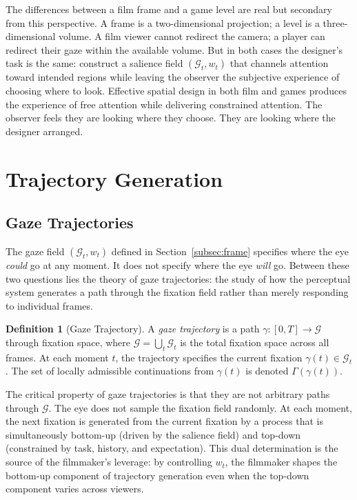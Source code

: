 \documentclass[12pt, a4paper]{article}
\theoremstyle{plain}
\theoremstyle{definition}
\newtheorem{definition}[theorem]{Definition}
\theoremstyle{remark}
\newcommand{\G}{\mathcal{G}}
\newcommand{\Traj}{\Gamma}
\newcommand{\traj}{\gamma}
\newcommand{\salience}{w}
\begin{document}
The differences between a film frame and a game level are
real but secondary from this perspective. A frame is a
two-dimensional projection; a level is a three-dimensional
volume. A film viewer cannot redirect the camera; a player
can redirect their gaze within the available volume. But in
both cases the designer's task is the same: construct a
salience field $(\G_t, \salience_t)$ that channels attention
toward intended regions while leaving the observer the
subjective experience of choosing where to look. Effective
spatial design in both film and games produces the experience
of free attention while delivering constrained attention.
The observer feels they are looking where they choose.
They are looking where the designer arranged.

\section{Trajectory Generation}
\label{sec:trajectory}

\subsection{Gaze Trajectories}
\label{subsec:gazetraj}

The gaze field $(\G_t, \salience_t)$ defined in
Section~\ref{subsec:frame} specifies where the eye
\emph{could} go at any moment. It does not specify where
the eye \emph{will} go. Between these two questions lies
the theory of gaze trajectories: the study of how the
perceptual system generates a path through the fixation
field rather than merely responding to individual frames.

\begin{definition}[Gaze Trajectory]
  A \emph{gaze trajectory} is a path $\traj : [0,T] \to \G$
  through fixation space, where $\G = \bigcup_t \G_t$ is
  the total fixation space across all frames. At each
  moment $t$, the trajectory specifies the current fixation
  $\traj(t) \in \G_t$. The set of locally admissible
  continuations from $\traj(t)$ is denoted $\Traj(\traj(t))$.
\end{definition}

The critical property of gaze trajectories is that they are
not arbitrary paths through $\G$. The eye does not sample
the fixation field randomly. At each moment, the next
fixation is generated from the current fixation by a
process that is simultaneously bottom-up (driven by the
salience field) and top-down (constrained by task, history,
and expectation). This dual determination is the source of
the filmmaker's leverage: by controlling $\salience_t$, the
filmmaker shapes the bottom-up component of trajectory
generation even when the top-down component varies across
viewers.
\end{document}
